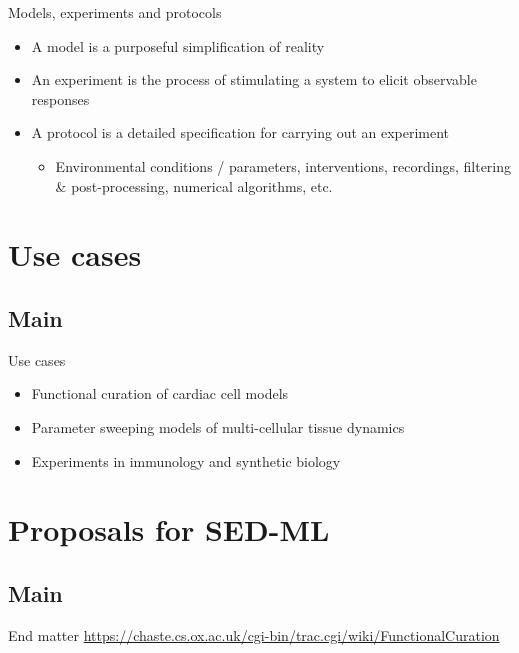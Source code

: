 \documentclass[t,xcolor={usenames,dvipsnames}]{beamer}
\newcommand{\subitem}[1]{\begin{itemize}[<.->]\item #1 \end{itemize}}
\begin{document}
\begin{frame}{Models, experiments and protocols}
\begin{itemize}
\item A \alert{model} is a purposeful simplification of reality
\item An \alert{experiment} is the process of stimulating a system to elicit observable responses
\item A \alert{protocol} is a detailed specification for carrying out an experiment
  \subitem{Environmental conditions / parameters, interventions, recordings, filtering \& post-processing, numerical algorithms, etc.}
\end{itemize}
\end{frame}


\section[Use cases]{Use cases}
\subsection*{Main}

\begin{frame}{Use cases}
\begin{itemize}
\item Functional curation of cardiac cell models
\item Parameter sweeping models of multi-cellular tissue dynamics
\item Experiments in immunology and synthetic biology
\end{itemize}
\end{frame}


\section{Proposals for SED-ML}
\subsection*{Main}



\begin{frame}{End matter}
\url{https://chaste.cs.ox.ac.uk/cgi-bin/trac.cgi/wiki/FunctionalCuration}
\end{frame}
\end{document}
